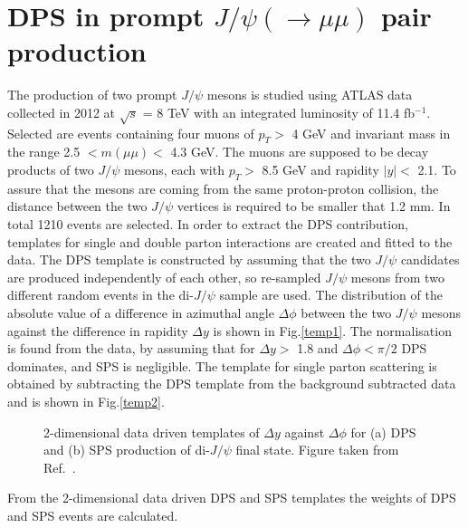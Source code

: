 \documentclass{ws-rv9x6}
\begin{document}
\section{DPS in prompt $J/\psi(\rightarrow \mu \mu)$ pair production}
The production of two prompt $J/\psi$ mesons \cite{dps4} is studied using ATLAS data collected in 2012 at $\sqrt{s}$ = 8 TeV with an integrated luminosity of 11.4 fb$^{-1}$. Selected are events containing four muons of $p_T >$ 4 GeV and invariant mass in the range 2.5 $< m(\mu\mu) <$ 4.3 GeV. The muons are supposed to be decay products of two $J/\psi$ mesons, each with $p_T >$ 8.5 GeV and rapidity $|y| < $ 2.1. To assure that the mesons are coming from the same proton-proton collision, the distance between the two $J/\psi$ vertices is required to be smaller that 1.2 mm.
In total 1210 events are selected.
In order to extract the DPS contribution, templates for single and double parton interactions are created and fitted to the data. The DPS template is constructed by assuming that the two  $J/\psi$ candidates are produced independently of each other, so  re-sampled $J/\psi$ mesons from two different random events in the di-$J/\psi$ sample are used. The distribution of the absolute value of a difference in azimuthal angle $\Delta \phi$ between the two $J/\psi$ mesons  against the difference in rapidity $\Delta y$ is shown in Fig.\ref{temp1}. The normalisation is found from the data, by assuming that for $\Delta y > $ 1.8 and $\Delta \phi < \pi/2$ DPS dominates, and SPS is negligible. The template for single parton scattering is obtained by subtracting the DPS template from the background subtracted data and is shown in Fig.\ref{temp2}.
\begin{figure}[ht]
\centerline{
  \hspace*{4pt}
}
\caption{2-dimensional data driven templates of $\Delta y$ against $\Delta\phi$ for (a) DPS and (b) SPS production of  di-$J/\psi$ final state. Figure taken from Ref.~.}\label{ra_fig2}
\end{figure}
From the 2-dimensional data driven DPS and SPS templates the weights of DPS and SPS events are calculated.
\end{document}
